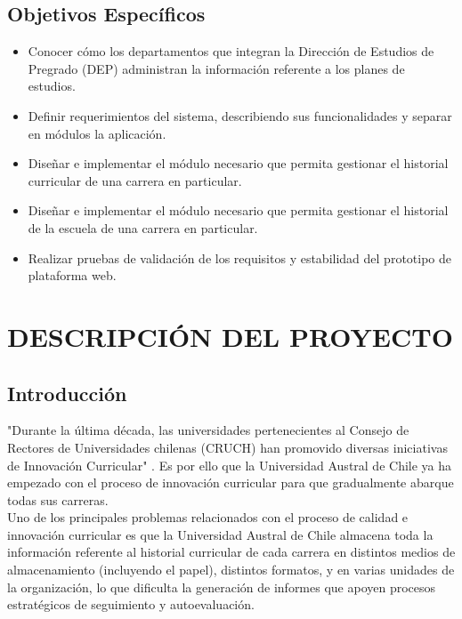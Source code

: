 \documentclass[12pt]{article}
\begin{document}
		\subsection{Objetivos Específicos}
		\begin{large}
			
			\begin{itemize}
				\item Conocer cómo los departamentos que integran la Dirección de Estudios de Pregrado (DEP) administran
				la información referente a los planes de estudios.
				\item  Definir requerimientos del sistema, describiendo sus funcionalidades y separar en módulos la aplicación.
				\item Diseñar e implementar el módulo necesario que permita gestionar el historial curricular de una carrera en particular.
				\item Diseñar e implementar el módulo necesario que permita gestionar el historial de la escuela de una carrera en particular.
				\item Realizar pruebas de validación de los requisitos y estabilidad del prototipo de plataforma web.
			\end{itemize}
		\end{large}
		\newpage
		
	\section{DESCRIPCIÓN DEL PROYECTO}
	
		\subsection{Introducción}
		
		"Durante la última década, las universidades pertenecientes al Consejo de Rectores de Universidades chilenas (CRUCH) 
		han promovido diversas iniciativas de Innovación Curricular" \cite{INN11}. Es por ello que la Universidad Austral de 
		Chile ya ha empezado con el proceso de innovación curricular para que gradualmente abarque todas sus carreras.
		\\
		
		Uno de los principales problemas relacionados con el proceso de calidad e innovación curricular es que la Universidad 
		Austral de Chile almacena toda la información referente al historial curricular de cada carrera en distintos medios 
		de almacenamiento (incluyendo el papel), distintos  formatos, y en varias unidades de la organización, lo que 
		dificulta la generación de informes que apoyen procesos estratégicos de seguimiento y autoevaluación.
		\\
		
\end{document}

